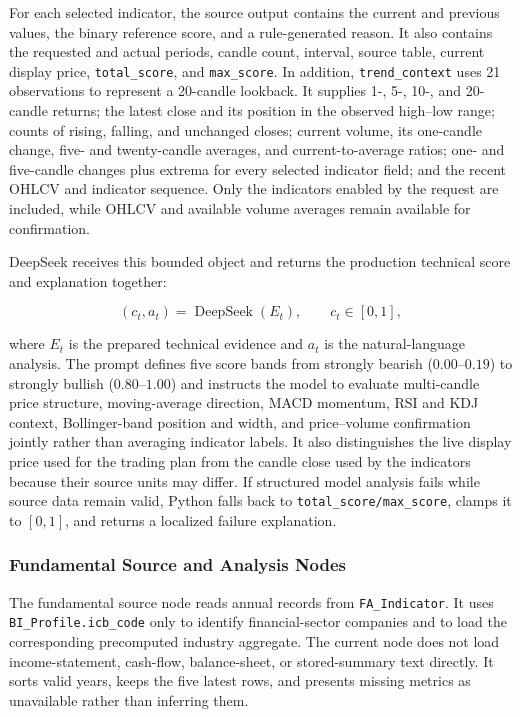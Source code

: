 For each selected indicator, the source output contains the current and previous values, the binary reference score, and a rule-generated reason. It also contains the requested and actual periods, candle count, interval, source table, current display price, \texttt{total\_score}, and \texttt{max\_score}. In addition, \texttt{trend\_context} uses 21 observations to represent a 20-candle lookback. It supplies 1-, 5-, 10-, and 20-candle returns; the latest close and its position in the observed high--low range; counts of rising, falling, and unchanged closes; current volume, its one-candle change, five- and twenty-candle averages, and current-to-average ratios; one- and five-candle changes plus extrema for every selected indicator field; and the recent OHLCV and indicator sequence. Only the indicators enabled by the request are included, while OHLCV and available volume averages remain available for confirmation.

DeepSeek receives this bounded object and returns the production technical score and explanation together:

\begin{equation}
    (c_t,a_t)=\operatorname{DeepSeek}(E_t),
    \qquad c_t\in[0,1],
    \label{eq:technical-normalized-score}
\end{equation}

where $E_t$ is the prepared technical evidence and $a_t$ is the natural-language analysis. The prompt defines five score bands from strongly bearish ($0.00$--$0.19$) to strongly bullish ($0.80$--$1.00$) and instructs the model to evaluate multi-candle price structure, moving-average direction, MACD momentum, RSI and KDJ context, Bollinger-band position and width, and price--volume confirmation jointly rather than averaging indicator labels. It also distinguishes the live display price used for the trading plan from the candle close used by the indicators because their source units may differ. If structured model analysis fails while source data remain valid, Python falls back to \texttt{total\_score/max\_score}, clamps it to $[0,1]$, and returns a localized failure explanation.

\subsubsection{Fundamental Source and Analysis Nodes}
\label{subsubsec:fundamental-analysis-node}

The fundamental source node reads annual records from \texttt{FA\_Indicator}. It uses \texttt{BI\_Profile.icb\_code} only to identify financial-sector companies and to load the corresponding precomputed industry aggregate. The current node does not load income-statement, cash-flow, balance-sheet, or stored-summary text directly. It sorts valid years, keeps the five latest rows, and presents missing metrics as unavailable rather than inferring them.

